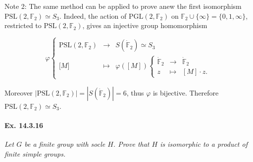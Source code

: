 \documentclass[11pt,a4paper]{article}
\newcommand{\F}{\mathbb{F}}
\begin{document}
 \bigskip
 
 Note 2: The same method can be applied to prove anew the first isomorphism $\mathrm{PSL}(2,\F_2) \simeq S_3$. Indeed, the action of $\mathrm{PGL}(2,\F_2)$ on $\F_2 \cup \{\infty\} = \{0,1,\infty\}$, restricted to $\mathrm{PSL}(2,\F_2)$, gives an injective group homomorphism
 
 $$\varphi
 \left\{
 \begin{array}{ccc}
 \mathrm{PSL}(2,\F_2) & \to & S(\dot{\F}_2)\simeq S_3\\
 {[}M{]} & \mapsto & 
     \varphi([M]) \left \{
     \begin{array}{ccc}
      \dot{\F}_2 & \to & \dot{\F}_2\\
      z & \mapsto &[M]\cdot z.
     \end{array}
     \right.
  \end{array}
 \right.
 $$
 
 Moreover $| \mathrm{PSL}(2,\F_2)| = |S(\dot{\F}_2)| = 6$, thus $\varphi$ is bijective. Therefore $\mathrm{PSL}(2,\F_2) \simeq S_3$.
 
 
 
  \paragraph{Ex. 14.3.16}{\it Let $G$ be a finite group with socle $H$. Prove that $H$ is isomorphic to a product of finite simple groups.
 
 }
 
\end{document}

